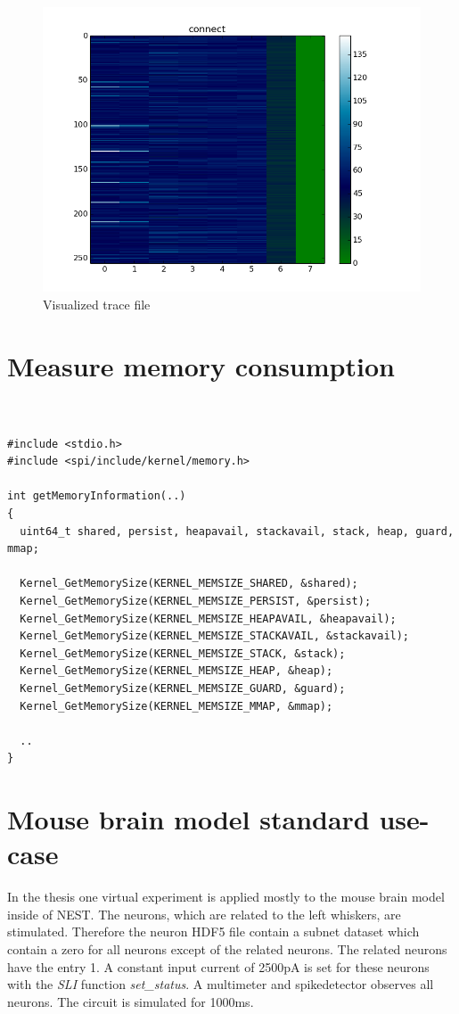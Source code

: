\begin{figure}[ht!]
\centering
\includegraphics[scale=0.4]{pictures/1per300_tracefile_connect.png}
\caption{Visualized trace file}
\end{figure}

\chapter{Measure memory consumption}

\begin{lstlisting}


#include <stdio.h>
#include <spi/include/kernel/memory.h>

int getMemoryInformation(..)
{
  uint64_t shared, persist, heapavail, stackavail, stack, heap, guard, mmap;

  Kernel_GetMemorySize(KERNEL_MEMSIZE_SHARED, &shared);
  Kernel_GetMemorySize(KERNEL_MEMSIZE_PERSIST, &persist);
  Kernel_GetMemorySize(KERNEL_MEMSIZE_HEAPAVAIL, &heapavail);
  Kernel_GetMemorySize(KERNEL_MEMSIZE_STACKAVAIL, &stackavail);
  Kernel_GetMemorySize(KERNEL_MEMSIZE_STACK, &stack);
  Kernel_GetMemorySize(KERNEL_MEMSIZE_HEAP, &heap);
  Kernel_GetMemorySize(KERNEL_MEMSIZE_GUARD, &guard);
  Kernel_GetMemorySize(KERNEL_MEMSIZE_MMAP, &mmap);

  ..
}

\end{lstlisting}

\chapter{Mouse brain model standard use-case}
\label{ambmusecase}
In the thesis one virtual experiment is applied mostly to the mouse brain model inside of NEST.
The neurons, which are related to the left whiskers, are stimulated.
Therefore the neuron HDF5 file contain a subnet dataset which contain a zero
for all neurons except of the related neurons. The related neurons have the entry 1.
A constant input current of 2500pA is set for these neurons with the \emph{SLI} function \emph{set\_status}.
A multimeter and spikedetector observes all neurons.
The circuit is simulated for 1000ms.


